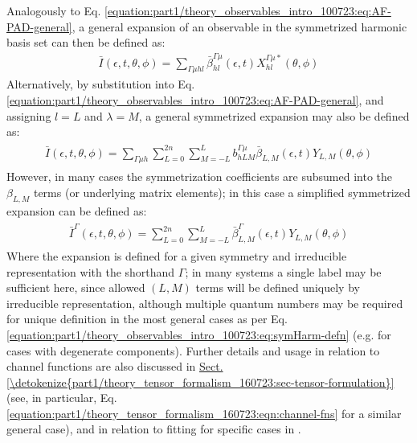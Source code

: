 \documentclass[letterpaper,table,10pt,english]{jupyterBook}
\begin{document}
\sphinxAtStartPar
Analogously to Eq. \eqref{equation:part1/theory_observables_intro_100723:eq:AF-PAD-general}, a general expansion of an observable in the symmetrized harmonic basis set can then be defined as:
\begin{equation}\label{equation:part1/theory_observables_intro_100723:eq:AF-PAD-general-symHarm}
\begin{split}
\bar{I}(\epsilon,t,\theta,\phi) = \sum_{\Gamma\mu hl}\bar{\beta}_{hl}^{\Gamma\mu}(\epsilon,t)X_{hl}^{\Gamma\mu*}(\theta,\phi)
\end{split}
\end{equation}
\sphinxAtStartPar
Alternatively, by substitution into Eq. \eqref{equation:part1/theory_observables_intro_100723:eq:AF-PAD-general}, and assigning \(l=L\) and \(\lambda=M\), a general symmetrized expansion may also be defined as:
\begin{equation}\label{equation:part1/theory_observables_intro_100723:eq:AF-PAD-general-symHarm-subs}
\begin{split}
\begin{align}
\bar{I}(\epsilon,t,\theta,\phi)=\sum_{\Gamma\mu h}\sum_{L=0}^{2n}\sum_{M=-L}^{L}b_{hLM}^{\Gamma\mu}\bar{\beta}_{L,M}(\epsilon,t)Y_{L,M}(\theta,\phi)
\end{align}
\end{split}
\end{equation}
\sphinxAtStartPar
However, in many cases the symmetrization coefficients are subsumed into the \(\beta_{L,M}\) terms (or underlying matrix elements); in this case a simplified symmetrized expansion can be defined as:
\begin{equation}\label{equation:part1/theory_observables_intro_100723:eq:AF-PAD-general-sym-betas}
\begin{split}
\begin{align}
\bar{I}^{\Gamma}(\epsilon,t,\theta,\phi)=\sum_{L=0}^{2n}\sum_{M=-L}^{L}\bar{\beta}^{\Gamma}_{L,M}(\epsilon,t)Y_{L,M}(\theta,\phi)
\end{align}
\end{split}
\end{equation}
\sphinxAtStartPar
Where the expansion is defined for a given symmetry and irreducible representation with the shorthand \(\Gamma\); in many systems a single label may be sufficient here, since allowed \((L,M)\) terms will be defined uniquely by irreducible representation, although multiple quantum numbers may be required for unique definition in the most general cases as per Eq. \eqref{equation:part1/theory_observables_intro_100723:eq:symHarm-defn} (e.g. for cases with degenerate components). Further details and usage in relation to channel functions are also discussed in \hyperref[\detokenize{part1/theory_tensor_formalism_160723:sec-tensor-formulation}]{Sect.\@ \ref{\detokenize{part1/theory_tensor_formalism_160723:sec-tensor-formulation}}} (see, in particular, Eq. \eqref{equation:part1/theory_tensor_formalism_160723:eqn:channel-fns} for a similar general case), and in relation to fitting for specific cases in {\hyperref[\detokenize{part2/extracting_matrix_elements_overview_270423:chpt-extracting-matrix-elements-overview}]{}}.
\end{document}

